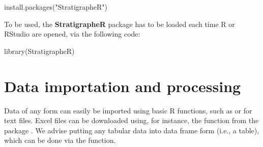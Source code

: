 \begin{example}
install.packages("StratigrapheR")
\end{example}

To be used, the \textbf{StratigrapheR} package has to be loaded each time R or RStudio are opened, via the following code:

\begin{example}
library(StratigrapheR)
\end{example}

\section{Data importation and processing}

Data of any form can easily be imported using basic R functions, such as  or  for text files. Excel files can be downloaded using, for instance, the  function from the  package \citep{dragulescu_xlsx_2020}. We advise putting any tabular data into data frame form (i.e., a table), which can be done via the  function.

